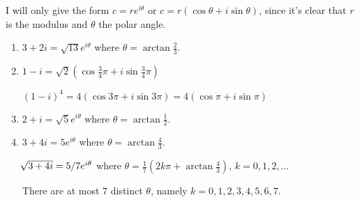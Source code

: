 \documentclass{homework}
\begin{document}
\begin{problem}{4}
I will only give the form $c = re^{i\theta}$ or $c = r(\cos\theta + i\sin\theta)$, since it's clear that $r$ is the modulus and $\theta$ the polar angle.

\begin{enumerate}
\item $3+2i = \sqrt{13}e^{i\theta}$ where $\theta = \arctan{\frac{2}{3}}$.

\item
$1-i = \sqrt{2}(\cos\frac{3}{4}\pi + i \sin\frac{3}{4}\pi)$

$(1-i)^4 = 4(\cos3\pi + i \sin3\pi) = 4(\cos\pi + i \sin\pi)$

\item $2 + i = \sqrt{5}e^{i\theta}$ where $\theta = \arctan{\frac{1}{2}}$.

\item
$3 + 4i = 5e^{i\theta}$ where $\theta = \arctan{\frac{4}{3}}$.

$\sqrt[\leftroot{7}]{3+4i} = 5/7e^{i\theta}$ where $\theta = \frac{1}{7}(2k\pi + \arctan{\frac{4}{3}})$, $k = 0,1,2,\hdots$

There are at most $7$ distinct $\theta$, namely $k = 0,1,2,3,4,5,6,7$.
\end{enumerate}
\end{problem}
\end{document}

